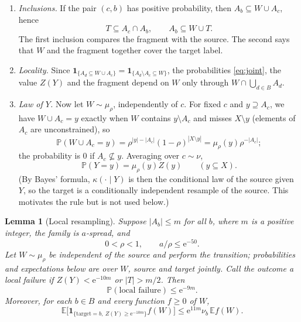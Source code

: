 \documentclass[11pt]{article}
\newtheorem{lemma}[theorem]{Lemma}
\numberwithin{equation}{section}
\newcommand{\PP}{\mathbb P}
\newcommand{\EE}{\mathbb E}
\newcommand{\ind}{\mathbf 1}
\newcommand{\ee}{\mathrm e}
\begin{document}
\begin{enumerate}[label=(O\arabic*),itemsep=2pt,topsep=3pt]
 \item\label{obs:incl} \emph{Inclusions.} If the pair $(c,b)$ has
 positive probability, then $A_b\subseteq W\cup A_c$, hence
 \begin{equation}\label{eq:two-inclusions}
  T\subseteq A_c\cap A_b,\qquad A_b\subseteq W\cup T.
 \end{equation}
 The first inclusion compares the fragment with the source. The second
 says that $W$ and the fragment together cover the target label.
 \item\label{obs:local} \emph{Locality.} Since
 $\ind_{\{A_d\subseteq W\cup A_c\}}=\ind_{\{A_d\setminus A_c\subseteq W\}}$,
 the probabilities \eqref{eq:joint}, the value $Z(Y)$ and the fragment
 depend on $W$ only through $W\cap\bigcup_{d\in B}A_d$.
 \item\label{obs:law} \emph{Law of $Y$.} Now let $W\sim\mu_\rho$,
 independently of $c$. For fixed $c$ and $y\supseteq A_c$, we have
 $W\cup A_c=y$ exactly when $W$ contains $y\setminus A_c$ and misses
 $X\setminus y$ (elements of $A_c$ are unconstrained), so
 \[
  \PP(W\cup A_c=y)=\rho^{|y|-|A_c|}(1-\rho)^{|X\setminus y|}
  =\mu_\rho(y)\rho^{-|A_c|};
 \]
 the probability is $0$ if $A_c\not\subseteq y$. Averaging over
 $c\sim\nu$,
 \begin{equation}\label{eq:density}
  \PP(Y=y)=\mu_\rho(y)Z(y)\qquad(y\subseteq X).
 \end{equation}
 (By Bayes' formula, $\kappa(\cdot\mid Y)$ is then the conditional law of
 the source given $Y$, so the target is a conditionally independent
 resample of the source. This motivates the rule but is not used below.)
\end{enumerate}

\begin{lemma}[Local resampling]\label{lem:local}
Suppose $|A_b|\le m$ for all $b$, where $m$ is a positive integer, the
family is $a$-spread, and
\[
 0<\rho<1,\qquad a/\rho\le\ee^{-50}.
\]
Let $W\sim\mu_\rho$ be independent of the source and perform the
transition; probabilities and expectations below are over $W$, source and
target jointly. Call the outcome a \emph{local failure} if
$Z(Y)<\ee^{-10m}$ or $|T|>m/2$. Then
\begin{equation}\label{eq:local-failure}
 \PP(\text{local failure})\le\ee^{-9m}.
\end{equation}
Moreover, for each $b\in B$ and every function $f\ge0$ of $W$,
\begin{equation}\label{eq:distortion}
 \EE\bigl[\ind_{\{\mathrm{target}=b,\ Z(Y)\ge\ee^{-10m}\}}f(W)\bigr]
 \le\ee^{11m}\nu_b\,\EE f(W).
\end{equation}
\end{lemma}
\end{document}
